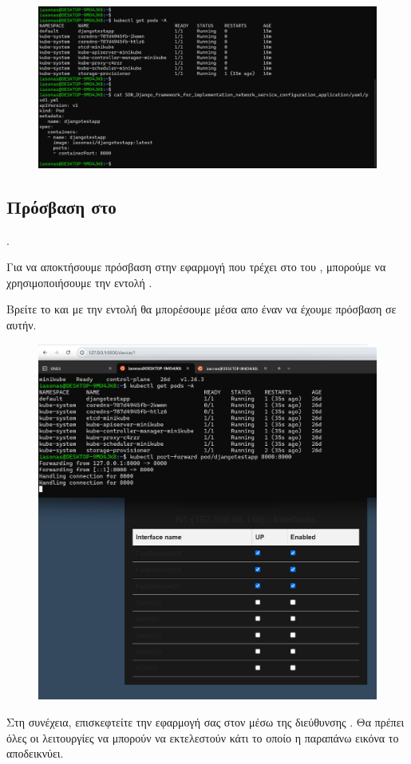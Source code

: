 \FloatBarrier

\begin{figure}[h]
	\centering
	\includegraphics[width=1.5\textwidth]{graphics/deploy_django.png}
	\caption{}
\end{figure}

\FloatBarrier

\subsection{Πρόσβαση στο }.

Για να αποκτήσουμε πρόσβαση στην εφαρμογή  που τρέχει στο  του , 
μπορούμε να χρησιμοποιήσουμε την εντολή . 

Βρείτε το  και με την εντολή  θα μπορέσουμε μέσα απο έναν 
να έχουμε πρόσβαση σε αυτήν.

\FloatBarrier

\begin{figure}[h]
	\centering
	\includegraphics[width=1.5\textwidth]{graphics/kubernetes_proxy.png}
	\caption{}
\end{figure}

\FloatBarrier

Στη συνέχεια, επισκεφτείτε την εφαρμογή σας στον  μέσω της διεύθυνσης . Θα πρέπει όλες οι λειτουργίες
να μπορούν να εκτελεστούν κάτι το οποίο η παραπάνω εικόνα το αποδεικνύει. 


